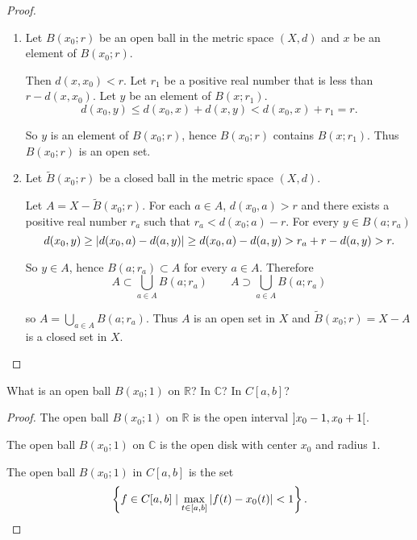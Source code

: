 \begin{proof}
    \begin{enumerate}[label={(\alph*)}]
        \item Let $B(x_{0}; r)$ be an open ball in the metric space $(X, d)$ and $x$ be an element of $B(x_{0}; r)$.

              Then $d(x, x_{0}) < r$. Let $r_{1}$ be a positive real number that is less than $r - d(x, x_{0})$. Let $y$ be an element of $B(x; r_{1})$.
              \[
                  d(x_{0}, y) \leq d(x_{0}, x) + d(x, y) < d(x_{0}, x) + r_{1} = r.
              \]

              So $y$ is an element of $B(x_{0}; r)$, hence $B(x_{0}; r)$ contains $B(x; r_{1})$. Thus $B(x_{0}; r)$ is an open set.
        \item Let $\widetilde{B}(x_{0}; r)$ be a closed ball in the metric space $(X, d)$.

              Let $A = X - \widetilde{B}(x_{0}; r)$. For each $a\in A$, $d(x_{0}, a) > r$ and there exists a positive real number $r_{a}$ such that $r_{a} < d(x_{0}; a) - r$. For every $y\in B(a; r_{a})$
              \[
                  d(x_{0}, y) \geq \left\vert{d(x_{0}, a) - d(a, y)}\right\vert \geq d(x_{0}, a) - d(a, y) > r_{a} + r - d(a, y) > r.
              \]

              So $y\in A$, hence $B(a; r_{a})\subset A$ for every $a\in A$. Therefore
              \[
                  A \subset \bigcup_{a\in A}B(a; r_{a})\qquad A \supset \bigcup_{a\in A}B(a; r_{a})
              \]

              so $A = \bigcup_{a\in A}B(a; r_{a})$. Thus $A$ is an open set in $X$ and $\widetilde{B}(x_{0}; r) = X - A$ is a closed set in $X$.
    \end{enumerate}
\end{proof}

\begin{exercise}\label{chapter1:section3:exercise2}
    What is an open ball $B(x_{0}; 1)$ on $\mathbb{R}$? In $\mathbb{C}$? In $C[a, b]$?
\end{exercise}

\begin{proof}
    The open ball $B(x_{0}; 1)$ on $\mathbb{R}$ is the open interval $\left]{x_{0} - 1, x_{0} + 1}\right[$.

    The open ball $B(x_{0}; 1)$ on $\mathbb{C}$ is the open disk with center $x_{0}$ and radius $1$.

    The open ball $B(x_{0}; 1)$ in $C[a, b]$ is the set
    \[
        \left\{ f \in C[a, b] \mid \max_{t\in [a, b]}\left\vert{f(t) - x_{0}(t)}\right\vert < 1 \right\}.
    \]
\end{proof}

